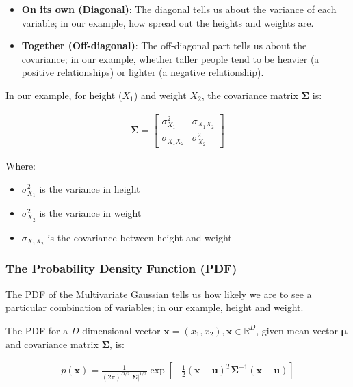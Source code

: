 \documentclass{article}
\begin{document}
\begin{itemize}
    \item \textbf{On its own (Diagonal)}: The diagonal tells us about the variance of each variable; in our example, how spread out the heights and weights are.
    \item \textbf{Together (Off-diagonal)}: The off-diagonal part tells us about the covariance; in our example, whether taller people tend to be heavier (a positive relationships) or lighter (a negative relationship). 
\end{itemize}

In our example, for height ($X_1$) and weight $X_2$, the covariance matrix $\boldsymbol \Sigma$ is: 

\begin{align*}
\boldsymbol{\Sigma} = \begin{bmatrix} {\sigma_{X_1}^2} & {\sigma_{X_1X_2}} \\  {\sigma_{X_1X_2}} & {\sigma_{X_2}^2} \end{bmatrix}
\end{align*}

Where:

\begin{itemize}
    \item $\sigma_{X_1}^2$ is the variance in height
    \item $\sigma_{X_2}^2$ is the variance in weight
    \item $\sigma_{X_1 X_2}$ is the covariance between height and weight
    
\end{itemize}

\subsubsection{The Probability Density Function (PDF)}

The PDF of the Multivariate Gaussian tells us how likely we are to see a particular combination of variables; in our example, height and weight.

The PDF for a $D$-dimensional vector $\boldsymbol{x} = (x_1, x_2), \boldsymbol{x} \in \mathbb{R}^D$, given mean vector $\boldsymbol{\mu}$ and covariance matrix $\boldsymbol{\Sigma}$, is:

\begin{align*}
p(\boldsymbol{x})= \frac {1} {(2\pi)^{D/2} |\boldsymbol{\Sigma}|^{1/2}} \exp{[-\frac 1 2 (\boldsymbol{x} - \boldsymbol{u})^T \boldsymbol{\Sigma}^{-1} (\boldsymbol{x} - \boldsymbol{u})]}
\end{align*}
\end{document}
